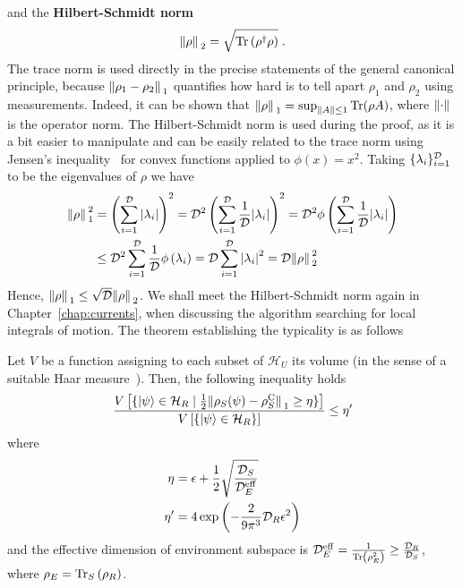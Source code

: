 and the \textbf{Hilbert-Schmidt norm}
\begin{equation}
	\norm*{\rho}_2 = \sqrt{\Tr\left(\rho^{\dagger}\rho\right)}\;.
\end{equation}
The trace norm is used directly in the precise statements of the general canonical principle, because
\(\norm*{\rho_1 - \rho_2}_1\) quantifies how hard is to tell apart \(\rho_1\) and \(\rho_2\) using measurements.
Indeed, it can be shown that \(\norm*{\rho}_1 = \mathrm{sup}_{\norm{A}\leq 1} \Tr(\rho A)\), where \(\norm{\cdot}\) is the operator norm.
The Hilbert-Schmidt norm is used during the proof, as it is a bit easier to manipulate and can be easily related to the
trace norm using Jensen's inequality~\autocite{Jensen1906} for convex functions applied to \(\phi(x) = x^2\). Taking \(\{\lambda_i\}_{i=1}^{\mathcal{D}}\) to be
the eigenvalues of \(\rho\) we have
\begin{align}
	\norm*{\rho}_1^2 & = \left(\sum_{i=1}^{\mathcal{D}}\abs{\lambda_i}\right)^2 = \mathcal{D}^2  \left(\sum_{i=1}^{\mathcal{D}}\frac{1}{\mathcal{D}}\abs{\lambda_i}\right)^2
	= \mathcal{D}^2 \phi\left(\sum_{i=1}^{\mathcal{D}}\frac{1}{\mathcal{D}}\abs{\lambda_i}\right) \nonumber                                                                 \\
	                 & \leq  {\mathcal{D}}^2 \sum_{i=1}^{\mathcal{D}}\frac{1}{\mathcal{D}} \phi\left(\lambda_i\right)
	= \mathcal{D} \sum_{i=1}^{\mathcal{D}} \abs{\lambda_i}^2 = \mathcal{D} \norm*{\rho}_2^2
\end{align}
Hence, \(\norm*{\rho}_1 \leq \sqrt{\mathcal{D}}\norm*{\rho}_2\). We shall meet the Hilbert-Schmidt norm again in Chapter~\ref{chap:currents},
when discussing the algorithm searching for local integrals of motion.
The theorem establishing the typicality is as follows
\begin{theorem}
	Let \(V\) be a function assigning to each subset of \(\mathcal{H}_U\) its volume (in the sense of a suitable Haar measure~\autocite{VitaliD.Milman1986}).
	Then, the following inequality holds
	\begin{equation}
		\frac{V\left[\{\ket{\psi}\in\mathcal{H}_R \mid \frac{1}{2}\norm*{\rho_S(\psi) - \rho_S^{\mathrm{C}}}_1\geq \eta\}\right]}
		{V\left[\{\ket{\psi}\in \mathcal{H}_R\}\right]} \leq \eta^{\prime}
	\end{equation}
	where
	\begin{align*}
		\eta          & = \epsilon + \frac{1}{2}\sqrt{\frac{\mathcal{D}_S}{\mathcal{D}_E^{\mathrm{eff}}}} \\
		\eta^{\prime} & = 4 \exp\left(-\frac{2}{9\pi^3} \mathcal{D}_R \epsilon^2\right)
	\end{align*}
	and the effective dimension of environment subspace is \(\mathcal{D}_E^{\mathrm{eff}} =
	\frac{1}{\Tr\left(\rho_E^2\right)}\geq \frac{\mathcal{D}_R}{\mathcal{D}_S}\), where \(\rho_E = \Tr_S\left(\rho_R\right)\).
\end{theorem}
